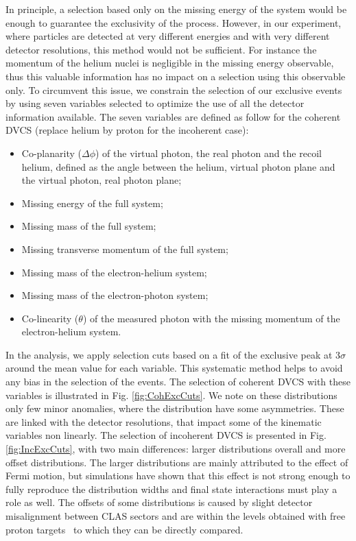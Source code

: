 \documentclass{article}
\begin{document}
In principle, 
a selection based only on the missing energy of the system would be
enough to guarantee the 
exclusivity of the process. However, in our experiment, where particles 
are detected at very different energies and with very different detector 
resolutions, this method would not be sufficient. For instance the momentum 
of the helium nuclei is negligible in the missing energy observable, thus
this valuable information has no impact on a selection using this observable only.
To circumvent this issue, we constrain the selection of our exclusive events by using seven 
variables selected to optimize the use of all the detector information available. 
The seven variables are defined as follow for the coherent 
DVCS (replace helium by proton for the incoherent case):
\begin{itemize}
	\item Co-planarity ($\Delta \phi$) of the virtual photon, the real photon and
		the recoil helium, defined as the angle between the helium, virtual photon
		plane and the virtual photon, real photon plane;
	\item Missing energy of the full system;
	\item Missing mass of the full system;
	\item Missing transverse momentum of the full system;
	\item Missing mass of the electron-helium system;
	\item Missing mass of the electron-photon system;
	\item Co-linearity ($\theta$) of the measured photon with the missing momentum of the 
		electron-helium system.
\end{itemize}

In the analysis, we apply selection cuts based on a fit of the exclusive peak at 3$\sigma$ around 
the mean value for each variable. This systematic method helps to avoid any bias 
in the selection of the events. The selection of coherent DVCS with these variables is illustrated in 
Fig. \ref{fig:CohExcCuts}. We note on these distributions only few minor anomalies, where the 
distribution have some asymmetries. These are linked with the detector resolutions, that impact
some of the kinematic variables non linearly. The selection of incoherent DVCS is presented in 
Fig. \ref{fig:IncExcCuts}, with two main differences: larger distributions overall and more
offset distributions. The larger distributions are mainly attributed to the effect of 
Fermi motion, but simulations have shown that this effect is not strong enough to fully 
reproduce the distribution widths and final state interactions must play a role as well. 
The offsets of some distributions is caused by slight detector 
misalignment between CLAS sectors and are within the levels obtained with free proton 
targets~\cite{HirlingerSaylor:2018bnu} to which they can be directly compared. 
\end{document}
